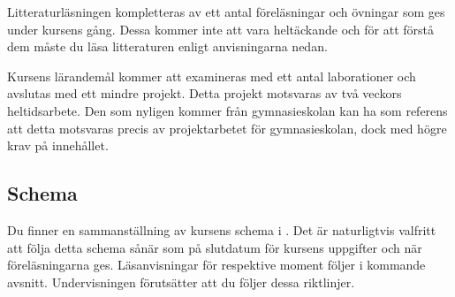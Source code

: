 \documentclass[a4paper,logo]{miunart}
\begin{document}
Litteraturläsningen kompletteras av ett antal föreläsningar och övningar som 
ges under kursens gång.
Dessa kommer inte att vara heltäckande och för att förstå dem måste du läsa 
litteraturen enligt anvisningarna nedan.

Kursens lärandemål kommer att examineras med ett antal laborationer och 
avslutas med ett mindre projekt.
Detta projekt motsvaras av två veckors heltidsarbete.
Den som nyligen kommer från gymnasieskolan kan ha som referens att detta 
motsvaras precis av projektarbetet för gymnasieskolan, dock med högre krav på 
innehållet.

\subsection{Schema}
\label{sec:schedule}
Du finner en sammanställning av kursens schema i .
Det är naturligtvis valfritt att följa detta schema sånär som på slutdatum för 
kursens uppgifter och när föreläsningarna ges.
Läsanvisningar för respektive moment följer i kommande avsnitt.
Undervisningen förutsätter att du följer dessa riktlinjer.
\end{document}

